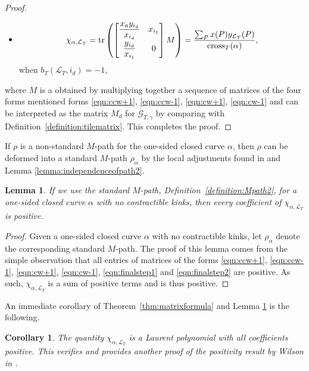 \documentclass[pdftex]{sigma}
\numberwithin{equation}{section}
\newtheorem{Corollary}[Theorem]{Corollary}
\newtheorem{Lemma}[Theorem]{Lemma}
\theoremstyle{definition}
\begin{document}
\begin{proof}
\begin{itemize}
when $ b_{T}(\mathcal{L}_{T}, i_{d})=1$,
\item \[
\chi_{\alpha, \mathcal{L}_T}=\operatorname{tr}\left(\begin{bmatrix}
\dfrac{x_ay_{i_d}}{x_{i_d}} & x_{i_1}\vspace{1mm}\\
\dfrac{y_{i_d}}{x_{i_1}} & 0
\end{bmatrix}M\right)=\frac{\sum_P x(P)y_{\mathcal{L}_T}(P)}{\operatorname{cross}_T(\alpha)}, \]
 when $ b_{T}(\mathcal{L}_{T}, i_{d})=-1$,
\end{itemize}
where $M$ is a obtained by multiplying together a sequence of matrices of the four forms mentioned forms \eqref{eqn:ccw+1}, \eqref{eqn:ccw-1}, \eqref{eqn:cw+1}, \eqref{eqn:cw-1} and can be interpreted as the matrix $M_d$ for $\overline{\mathcal{G}}_{T, \gamma}$ by comparing with Definition~\ref{definition:tilematrix}. This completes the proof.
\end{proof}

If $\rho$ is a non-standard $M$-path for the one-sided closed curve $\alpha$, then $\rho$ can be deformed into a standard $M$-path $\rho_{\alpha}$ by the local adjustments found in \cite[Lemma 4.8]{MW13} and Lemma \ref{lemma:independenceofpath2}.

\begin{Lemma}\label{lemma:positivecoef}
If we use the standard $M$-path, Definition~{\rm\ref{definition:Mpath2}}, for a one-sided closed curve $\alpha$ with no contractible kinks, then every coefficient of $\chi_{\alpha, \mathcal{L}_T}$ is positive.
\end{Lemma}
\begin{proof}
Given a one-sided closed curve $\alpha$ with no contractible kinks, let $\rho_{\alpha}$ denote the corresponding standard $M$-path. The proof of this lemma comes from the simple observation that all entries of matrices of the forms \eqref{eqn:ccw+1}, \eqref{eqn:ccw-1}, \eqref{eqn:cw+1}, \eqref{eqn:cw-1}, \eqref{eqn:finalstep1} and \eqref{eqn:finalstep2} are positive. As such, $\chi_{\alpha, \mathcal{L}_T}$ is a sum of positive terms and is thus positive.
\end{proof}

An immediate corollary of Theorem~\ref{thm:matrixformula} and Lemma \ref{lemma:positivecoef} is the following.

\begin{Corollary}
The quantity $\chi_{\alpha, \mathcal{L}_T}$ is a Laurent polynomial with all coefficients positive. This verifies and provides another proof of the positivity result by Wilson in {\rm\cite{Wil19}}.
\end{Corollary}
\end{document}
